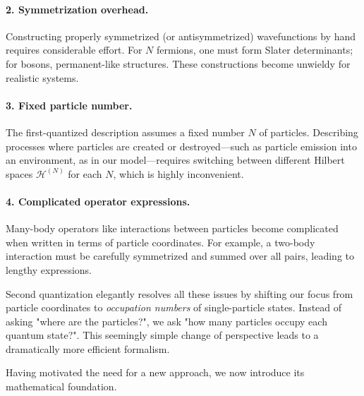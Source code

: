 \documentclass[12pt,oneside,openright]{report}
\theoremstyle{definition}
\theoremstyle{plain}
\theoremstyle{remark}
\begin{document}
\paragraph{2. Symmetrization overhead.}
Constructing properly symmetrized (or antisymmetrized) wavefunctions by hand requires considerable effort. 
For $N$ fermions, one must form Slater determinants; for bosons, permanent-like structures. 
These constructions become unwieldy for realistic systems.

\paragraph{3. Fixed particle number.}
The first-quantized description assumes a fixed number $N$ of particles. Describing processes 
where particles are created or destroyed—such as particle emission into an environment, as in 
our model—requires switching between different Hilbert spaces $\mathcal{H}^{(N)}$ for each $N$, 
which is highly inconvenient.

\paragraph{4. Complicated operator expressions.}
Many-body operators like interactions between particles become complicated when written 
in terms of particle coordinates. For example, a two-body interaction must be carefully 
symmetrized and summed over all pairs, leading to lengthy expressions.

Second quantization elegantly resolves all these issues by shifting our focus from particle 
coordinates to \emph{occupation numbers} of single-particle states. Instead of asking "where 
are the particles?", we ask "how many particles occupy each quantum state?". This seemingly 
simple change of perspective leads to a dramatically more efficient formalism.

Having motivated the need for a new approach, we now introduce its mathematical foundation.
\end{document}
